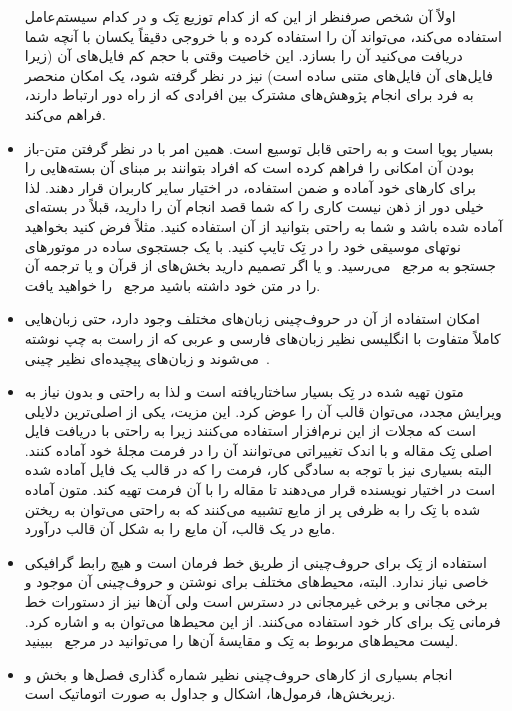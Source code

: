 \begin{itemize}
اولاً آن شخص صرفنظر از این که از کدام توزیع تِک و در کدام سیستم‌عامل 
استفاده می‌کند، می‌تواند آن را استفاده کرده و با خروجی دقیقاً یکسان با آنچه شما دریافت می‌کنید
آن را بسازد. این خاصیت وقتی با حجم کم فایل‌های آن (زیرا فایل‌های آن فایل‌های متنی ساده است)
 نیز در نظر گرفته شود، یک امکان
منحصر به فرد برای انجام پژوهش‌های مشترک بین افرادی که از راه دور ارتباط دارند، فراهم
می‌کند.
\item بسیار پویا  است و به راحتی قابل توسیع است. همین امر با در نظر گرفتن متن-باز
بودن آن امکانی را فراهم کرده است که افراد بتوانند بر مبنای آن بسته‌هایی را برای
کارهای خود آماده و ضمن استفاده، در اختیار سایر کاربران قرار دهند. لذا خیلی دور از ذهن
نیست کاری را که شما قصد انجام آن را دارید، قبلاً در بسته‌ای آماده شده باشد و شما
به راحتی بتوانید از آن استفاده کنید. مثلاً فرض کنید بخواهید نوتهای موسیقی خود را
در تِک تایپ کنید. با یک جستجوی ساده در موتورهای جستجو به مرجع~\cite{Music}
می‌رسید. و یا اگر تصمیم دارید بخش‌های از قرآن و یا ترجمه آن  را در متن خود داشته باشید 
مرجع~\cite{quran} را خواهید یافت. 
\item امکان استفاده از آن در حروف‌چینی زبان‌های مختلف وجود دارد، حتی زبان‌هایی
کاملاً متفاوت با انگلیسی نظیر زبان‌های فارسی و عربی که از راست به چپ نوشته می‌شوند
و زبان‌های پیچیده‌ای نظیر چینی~\cite{Art}.
\item متون تهیه شده در تِک بسیار ساختاریافته است و لذا به راحتی و بدون نیاز به 
ویرایش مجدد، می‌توان قالب آن را عوض کرد. این مزیت، یکی از اصلی‌ترین دلایلی است
که مجلات از این نرم‌افزار استفاده می‌کنند زیرا به راحتی با دریافت فایل اصلی تِک مقاله
و با اندک تغییراتی می‌توانند آن را در فرمت مجلۀ خود آماده کنند. البته بسیاری نیز با توجه
به سادگی کار، فرمت را که در قالب یک فایل آماده شده است در اختیار نویسنده قرار می‌دهند
تا مقاله را با آن فرمت تهیه کند. متون آماده شده با تِک را به ظرفی پر از مایع تشبیه
می‌کنند که به راحتی می‌توان به ریختن مایع در یک قالب، آن مایع را به شکل آن 
 قالب درآورد.
 \item استفاده از تِک برای حروف‌چینی از طریق خط فرمان است و هیچ رابط گرافیکی
 خاصی نیاز ندارد. البته، محیط‌های مختلف برای نوشتن و حروف‌چینی آن موجود و برخی
 مجانی و برخی غیرمجانی در دسترس است ولی آن‌ها نیز از دستورات خط فرمانی
 تِک برای کار خود استفاده می‌کنند. از این محیط‌ها می‌توان به 
 و 
 اشاره کرد. لیست محیط‌های مربوط به تِک و مقایسۀ آن‌ها 
 را می‌توانید در مرجع~\cite{Editors} ببینید.
 \item انجام بسیاری از کارهای حروف‌چینی  نظیر شماره گذاری
 فصل‌ها و بخش و \linebreak زیربخش‌ها، فرمول‌ها، اشکال و جداول به صورت اتوماتیک است.

\end{itemize}
